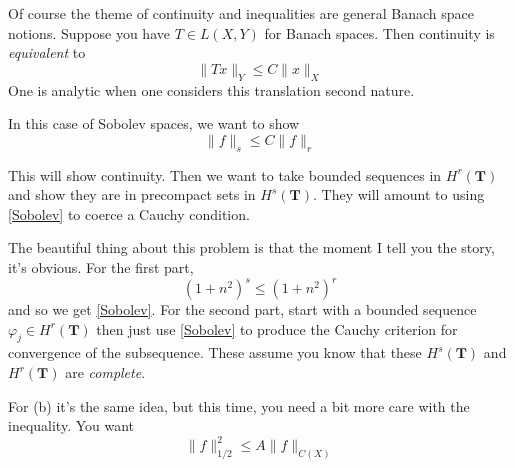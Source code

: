 \documentclass{amsart}
\begin{document}
Of course the theme of continuity and inequalities are general Banach space notions.  Suppose you have $T \in L(X,Y)$ for Banach spaces.  Then continuity is {\em equivalent} to 
\[
\| Tx \|_Y \le C \| x \|_X
\]
One is analytic when one considers this translation second nature.

In this case of Sobolev spaces, we want to show
\begin{equation}
\label{Sobolev}
\| f \|_s \le C \| f \|_r
\end{equation}

This will show continuity.  Then we want to take bounded sequences in $H^r(\mathbf{T})$ and show they are in precompact sets in $H^s(\mathbf{T})$. They will amount to using \eqref{Sobolev} to coerce a Cauchy condition.

The beautiful thing about this problem is that the moment I tell you the story, it's obvious.  For the first part,
\[
(1+n^2)^s \le (1+n^2)^r
\]
and so we get \eqref{Sobolev}.  For the second part, start with a bounded sequence $\varphi_j \in H^r(\mathbf{T})$ then just use \eqref{Sobolev} to produce the Cauchy criterion for convergence of the subsequence.  These assume you know that these $H^s(\mathbf{T})$ and $H^r(\mathbf{T})$ are {\em complete}.

For (b) it's the same idea, but this time, you need a bit more care with the inequality.  You want
\[
\| f \|_{1/2}^2 \le  A \| f \|_{C(X)}
\]
\end{document}
